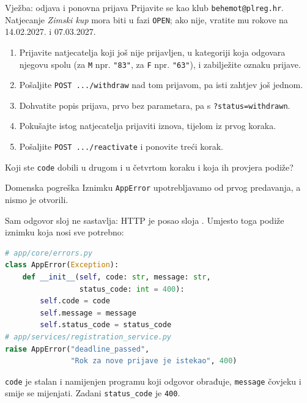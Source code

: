 \begin{frame}{Vježba: odjava i ponovna prijava}
Prijavite se kao klub \texttt{behemot@plreg.hr}. Natjecanje \emph{Zimski kup} mora biti u fazi \texttt{OPEN}; ako nije, vratite mu rokove na 14.02.2027. i 07.03.2027.

\vspace{0.8em}
\begin{enumerate}
  \itemsep0.4em
  \item Prijavite natjecatelja koji još nije prijavljen, u kategoriji koja odgovara njegovu spolu (za \texttt{M} npr. \texttt{"83"}, za \texttt{F} npr. \texttt{"63"}), i zabilježite oznaku prijave.
  \item Pošaljite \texttt{POST .../withdraw} nad tom prijavom, pa isti zahtjev još jednom.
  \item Dohvatite popis prijava, prvo bez parametara, pa s \texttt{?status=withdrawn}.
  \item Pokušajte istog natjecatelja prijaviti iznova, tijelom iz prvog koraka.
  \item Pošaljite \texttt{POST .../reactivate} i ponovite treći korak.
\end{enumerate}

\vspace{0.8em}
Koji ste \texttt{code} dobili u drugom i u četvrtom koraku i koja ih provjera podiže?
\end{frame}


\begin{frame}[fragile]{Domenska pogreška}
Iznimku \texttt{AppError} upotrebljavamo od prvog predavanja, a nismo je otvorili.

\vspace{0.3em}
Sam odgovor sloj  ne sastavlja: HTTP je posao sloja . Umjesto toga podiže iznimku koja nosi sve potrebno:

\begin{lstlisting}[language=python]
# app/core/errors.py
class AppError(Exception):
    def __init__(self, code: str, message: str,
                 status_code: int = 400):
        self.code = code
        self.message = message
        self.status_code = status_code
# app/services/registration_service.py
raise AppError("deadline_passed",
               "Rok za nove prijave je istekao", 400)
\end{lstlisting}

\vspace{0.2em}
\texttt{code} je stalan i namijenjen programu koji odgovor obrađuje, \texttt{message} čovjeku i smije se mijenjati. Zadani \texttt{status\_code} je \texttt{400}.
\end{frame}

